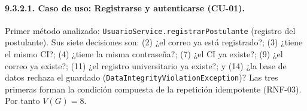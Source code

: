 
\paragraph{9.3.2.1. Caso de uso: Registrarse y autenticarse (CU-01).}

Primer método analizado: \texttt{UsuarioService.registrarPostulante} (registro del postulante). Sus siete decisiones son: (2) ¿el correo ya está registrado?; (3) ¿tiene el mismo CI?; (4) ¿tiene la misma contraseña?; (7) ¿el CI ya existe?; (9) ¿el correo ya existe?; (11) ¿el registro universitario ya existe?; y (14) ¿la base de datos rechaza el guardado (\texttt{DataIntegrityViolationException})? Las tres primeras forman la condición compuesta de la repetición idempotente (RNF-03). Por tanto $V(G)=8$.

